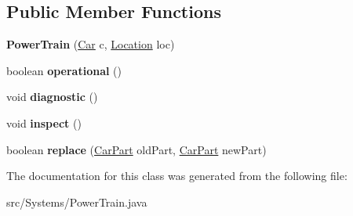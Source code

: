 \subsection*{Public Member Functions}
\begin{DoxyCompactItemize}
\item 
\hypertarget{classSystems_1_1PowerTrain_a61bc328ef205d36c441342ff899de6d0}{}{\bfseries Power\+Train} (\hyperlink{classCars_1_1Car}{Car} c, \hyperlink{enumEnums_1_1Location}{Location} loc)\label{classSystems_1_1PowerTrain_a61bc328ef205d36c441342ff899de6d0}

\item 
\hypertarget{classSystems_1_1PowerTrain_abf8c02ac78cf1645001ff46505b43084}{}boolean {\bfseries operational} ()\label{classSystems_1_1PowerTrain_abf8c02ac78cf1645001ff46505b43084}

\item 
\hypertarget{classSystems_1_1PowerTrain_ac94f236f68a0cfe47e7d93bda0085171}{}void {\bfseries diagnostic} ()\label{classSystems_1_1PowerTrain_ac94f236f68a0cfe47e7d93bda0085171}

\item 
\hypertarget{classSystems_1_1PowerTrain_a59f989bb9c83a00a6debb9965b51daad}{}void {\bfseries inspect} ()\label{classSystems_1_1PowerTrain_a59f989bb9c83a00a6debb9965b51daad}

\item 
\hypertarget{classSystems_1_1PowerTrain_a4bb7f81e681e1243b8dd6978cd480eaa}{}boolean {\bfseries replace} (\hyperlink{classCars_1_1CarPart}{Car\+Part} old\+Part, \hyperlink{classCars_1_1CarPart}{Car\+Part} new\+Part)\label{classSystems_1_1PowerTrain_a4bb7f81e681e1243b8dd6978cd480eaa}

\end{DoxyCompactItemize}


The documentation for this class was generated from the following file\+:\begin{DoxyCompactItemize}
\item 
src/\+Systems/Power\+Train.\+java\end{DoxyCompactItemize}
